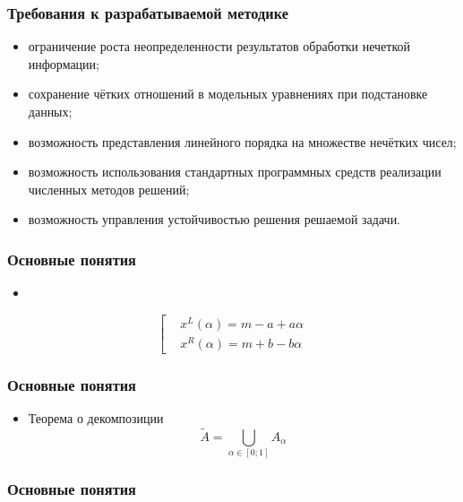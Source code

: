 \documentclass[12pt]{beamer}
\begin{document}
\begin{frame}
  \frametitle{Требования к разрабатываемой методике}
  \begin{itemize}
	\item ограничение роста неопределенности результатов обработки нечеткой информации;
	\item сохранение чётких отношений в модельных уравнениях при подстановке данных;
	\item возможность представления линейного порядка на множестве нечётких чисел;
	\item возможность использования стандартных программных средств реализации численных методов решений;
	\item возможность управления устойчивостью решения решаемой задачи.
  \end{itemize}
\end{frame}

\begin{frame}
  \frametitle{Основные понятия}
  \begin{itemize}
    \item 
  \end{itemize}

  \begin{equation}
    \label{eq:membership-alphacut-form}
	\left[ 
		\begin{aligned}
			& x^L(\alpha )=m-a+a\alpha  \\ 
			& x^R(\alpha )=m+b-b\alpha
		 \end{aligned}
	\right.
  \end{equation}
\end{frame}

\begin{frame}
  \frametitle{Основные понятия}
  \begin{itemize}
    \item Теорема о декомпозиции 
      \begin{equation}
        \tilde{A}=\bigcup\limits_{\alpha \in \left[ 0;1 \right]}{A_\alpha}
      \end{equation}
  \end{itemize}
\end{frame}


\begin{frame}
  \frametitle{Основные понятия}
    
\end{frame}
\end{document}
